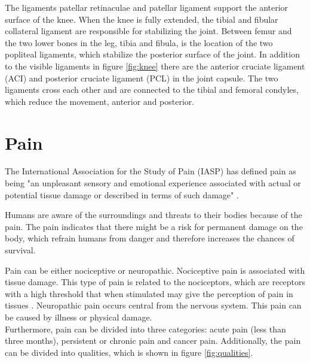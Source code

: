 \noindent
The ligaments patellar retinaculae and patellar ligament support the anterior surface of the knee. When the knee is fully extended, the tibial and fibular collateral ligament are responsible for stabilizing the joint. Between femur and the two lower bones in the leg, tibia and fibula, is the location of the two popliteal ligaments, which stabilize the posterior surface of the joint. In addition to the visible ligaments in figure \ref{fig:knee} there are the anterior cruciate ligament (ACI) and posterior cruciate ligament (PCL) in the joint capsule. The two ligaments cross each other and are connected to the tibial and femoral condyles, which reduce the movement, anterior and posterior.\citep{Martini2012}\newline
\noindent


\section{Pain}
The International Association for the Study of Pain (IASP) has defined pain as being "an unpleasant sensory and emotional experience associated with actual or potential tissue damage or described in terms of such damage" \citep{IASP2012, Schmidt1989}. 

\noindent
Humans are aware of the surroundings and threats to their bodies because of the pain. The pain indicates that there might be a risk for permanent damage on the body, which refrain humans from danger and therefore increases the chances of survival. 


\noindent
Pain can be either nociceptive or neuropathic. Nociceptive pain is associated with tissue damage. This type of pain is related to the nociceptors, which are receptors with a high threshold that when stimulated may give the perception of pain in tissues \citep{Schmidt2013}. Neuropathic pain occurs central from the nervous system. This pain can be caused by illness or physical damage.\citep{Schmidt2013} \\


\noindent
Furthermore, pain can be divided into three categories: acute pain (less than three months), persistent or chronic pain and cancer pain.\citep{Briggs2010} Additionally, the pain can be divided into qualities, which is shown in figure \ref{fig:qualities}. 

